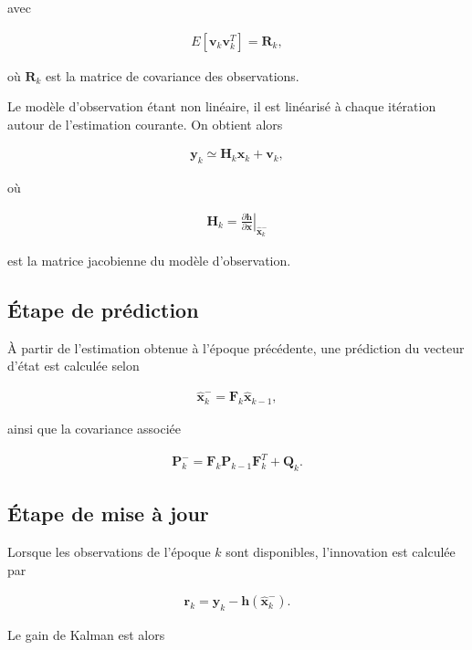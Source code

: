avec

\begin{align}
E[\mathbf{v}_k\mathbf{v}_k^T]
=
\mathbf{R}_k,
\end{align}

où $\mathbf{R}_k$ est la matrice de covariance des observations.

Le modèle d'observation étant non linéaire, il est linéarisé à chaque itération autour de l'estimation courante. On obtient alors

\begin{align}
\mathbf{y}_k
\simeq
\mathbf{H}_k
\mathbf{x}_k
+
\mathbf{v}_k,
\end{align}

où

\begin{align}
\mathbf{H}_k
=
\left.
\frac{\partial \mathbf{h}}
{\partial \mathbf{x}}
\right|_{\hat{\mathbf{x}}_k^{-}}
\end{align}

est la matrice jacobienne du modèle d'observation.

\subsection{Étape de prédiction}

À partir de l'estimation obtenue à l'époque précédente, une prédiction du vecteur d'état est calculée selon

\begin{align}
\hat{\mathbf{x}}_k^{-}
=
\mathbf{F}_k
\hat{\mathbf{x}}_{k-1},
\end{align}

ainsi que la covariance associée

\begin{align}
\mathbf{P}_k^{-}
=
\mathbf{F}_k
\mathbf{P}_{k-1}
\mathbf{F}_k^{T}
+
\mathbf{Q}_k.
\end{align}

\subsection{Étape de mise à jour}

Lorsque les observations de l'époque $k$ sont disponibles, l'innovation est calculée par

\begin{align}
\mathbf{r}_k
=
\mathbf{y}_k
-
\mathbf{h}
(\hat{\mathbf{x}}_k^{-}).
\end{align}

Le gain de Kalman est alors

